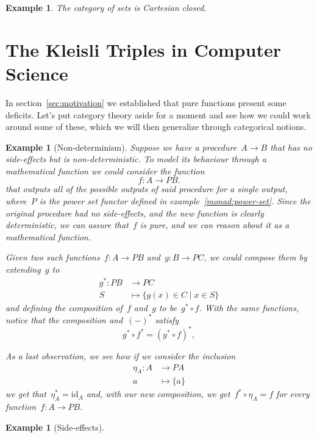 \documentclass[a4paper]{article}
\theoremstyle{plain}
\newtheorem{example}[theorem]{Example}
\theoremstyle{definition}
\newcommand{\id}{\mathrm{id}}
\begin{document}
\begin{example}
    The category of sets is Cartesian closed.
\end{example}

\section{The Kleisli Triples in Computer Science}
In section~\ref{sec:motivation} we established that pure functions present some
deficits. Let's put category theory aside for a moment and see how we could work
around some of these, which we will then generalize through categorical notions.
\begin{example}[Non-determinism]
    Suppose we have a procedure~\(A\longrightarrow B\) that has no side-effects
    but is non-deterministic. To model its behaviour through a mathematical
    function we could consider the function
    \[
        f:A\longrightarrow PB.
    \]
    that outputs all of the possible outputs of said procedure for a single
    output, where~\(P\) is the power set functor defined in
    example~\ref{monad:power-set}. Since the original procedure had no
    side-effects, and the new function is clearly deterministic, we can assure
    that~\(f\) is pure, and we can reason about it as a mathematical function.

    Given two such functions~\(f:A\longrightarrow PB\)
    and~\(g:B\longrightarrow PC\), we could compose them by extending~\(g\) to
    \begin{align*}
        g^{\ast}:PB&\longrightarrow PC \\
        S&\longmapsto\{g(x)\in C \mid x\in S\}
    \end{align*}
    and defining the composition of~\(f\) and~\(g\) to be~\(g^{\ast} \circ f\).
    With the same functions, notice that the composition and~\((-)^{\ast}\)
    satisfy
    \[
        g^{\ast}\circ f^{\ast}
        = (g^{\ast} \circ f)^{\ast},
    \]

    As a last observation, we see how if we consider the inclusion
    \begin{align*}
        \eta_{A}:A&\longrightarrow PA \\
        a&\longmapsto\{a\}
    \end{align*}
    we get that~\(\eta_{A}^{\ast}=\id_{A}\) and, with our new
    composition, we get~\(f^{\ast}\circ\eta_{A}=f\) for every
    function~\(f:A\longrightarrow PB\).
\end{example}

\begin{example}[Side-effects]
\end{example}
\end{document}
